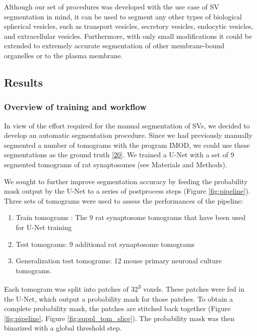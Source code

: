 Although our set of procedures was developed with the use case of SV segmentation in mind, it can be used to segment any other types of biological spherical vesicles, such as transport vesicles, secretory vesicles, endocytic vesicles, and extracellular vesicles.
Furthermore, with only small modifications it could be extended to extremely accurate segmentation of other membrane-bound organelles or to the plasma membrane.

\hypertarget{results}{%
\subsection{Results}\label{results}}

\hypertarget{overview-of-training-and-workflow}{%
\subsubsection{Overview of training and workflow}\label{overview-of-training-and-workflow}}

In view of the effort required for the manual segmentation of SVs, we decided to develop an automatic segmentation procedure.
Since we had previously manually segmented a number of tomograms with the program IMOD, we could use these segmentations as the ground truth {[}\protect\hyperlink{ref-136NHHp17}{20}{]}.
We trained a U-Net with a set of 9 segmented tomograms of rat synaptosomes (see Materials and Methods).

We sought to further improve segmentation accuracy by feeding the probability mask output by the U-Net to a series of postprocess steps (Figure \ref{fig:pipeline}).
Three sets of tomograms were used to assess the performances of the pipeline:

\begin{enumerate}
\def\labelenumi{\arabic{enumi})}
\tightlist
\item
  Train tomograms : The 9 rat synaptosome tomograms that have been used for U-Net training
\item
  Test tomograms: 9 additional rat synaptosome tomograms
\item
  Generalization test tomograms: 12 mouse primary neuronal culture tomograms.
\end{enumerate}

Each tomogram was split into patches of 32\textsuperscript{3} voxels.
These patches were fed in the U-Net, which output a probability mask for those patches.
To obtain a complete probability mask, the patches are stitched back together (Figure \ref{fig:pipeline}, Figure \ref{fig:suppl_tom_slice}).
The probability mask was then binarized with a global threshold step.

